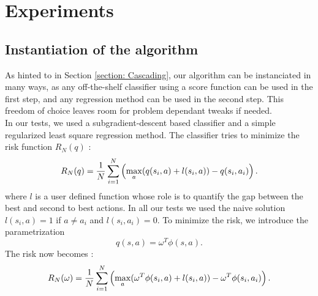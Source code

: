 \documentclass{llncs}
\newcommand{\0}{\mathbf{0}}
\newcommand{\1}{\mathbf{1}}
\begin{document}
\section{Experiments}
\label{section: experiments}
\subsection{Instantiation of the algorithm}
As hinted to in Section \ref{section: Cascading}, our algorithm can be instanciated in many ways, as any off-the-shelf classifier using a score function can be used in the first step, and any regression method can be used in the second step. This freedom of choice leaves room for problem dependant tweaks if needed.\\

In our tests, we used a subgradient-descent based classifier and a simple regularized least square regression method. The classifier tries to minimize the risk function $R_N(q)$ :
\begin{equation}
  R_N(q) = {1\over N} \sum_{i=1}^N\left(\max_{a}(q(s_i,a) + l(s_i,a)) - q(s_i,a_i) \right).
\end{equation}
where $l$ is a user defined function whose role is to quantify the gap between the best and second to best actions. In all our tests we used the naive solution $l(s_i,a) = 1$ if $a\neq a_i$ and $l(s_i,a_i) = 0$. To minimize the risk, we introduce the parametrization 
\begin{equation}
  q(s,a) = \omega^T\phi(s,a).
\end{equation}
The risk now becomes :
\begin{equation}
  R_N(\omega) = {1\over N} \sum_{i=1}^N\left(\max_{a}(\omega^T\phi(s_i,a) + l(s_i,a)) - \omega^T\phi(s_i,a_i) \right).
\end{equation}
\end{document}
